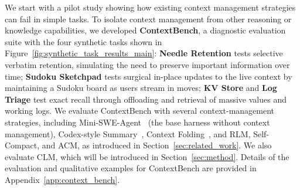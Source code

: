 \documentclass{fairmeta}
\newcommand{\clmhl}[1]{\textcolor{clmblue}{\textbf{#1}}}
\newcommand{\ours}{CLM\xspace}
\newcommand{\ourbench}{ContextBench\xspace}
\begin{document}
We start with a pilot study showing how existing context management strategies can fail in simple tasks.
To isolate context management from other reasoning or knowledge capabilities, we developed \clmhl{\ourbench}, a diagnostic evaluation suite with the four synthetic tasks shown in
Figure~\ref{fig:synthetic_task_results_main}: \textbf{Needle Retention} tests selective verbatim retention, simulating the need to preserve important information over time; \textbf{Sudoku Sketchpad} tests surgical in-place updates to the live context by maintaining a Sudoku board as users stream in moves; \textbf{KV Store} and \textbf{Log Triage} test exact recall through offloading and retrieval of massive values and working logs. 
% 
We evaluate \ourbench{} with several context-management strategies, including Mini-SWE-Agent~\citep{yang2024sweagent} (the base harness without context management), Codex-style Summary~\citep{openai2026codex}, Context Folding~\citep{sun2025scaling}, and RLM, Self-Compact, and ACM, as introduced in Section~\ref{sec:related_work}. We also evaluate \ours{}, which will be introduced in Section~\ref{sec:method}.
Details of the evaluation and qualitative examples for \ourbench{} are provided in Appendix~\ref{app:context_bench}.
\end{document}
